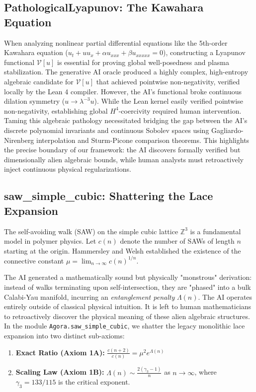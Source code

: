 \documentclass[11pt,a4paper]{article}
\begin{document}
\subsection{PathologicalLyapunov: The Kawahara Equation}
When analyzing nonlinear partial differential equations like the 5th-order Kawahara equation ($u_t + u u_x + \alpha u_{xxx} + \beta u_{xxxxx} = 0$), constructing a Lyapunov functional $\mathcal{V}[u]$ is essential for proving global well-posedness and plasma stabilization. 
The generative AI oracle produced a highly complex, high-entropy algebraic candidate for $\mathcal{V}[u]$ that achieved pointwise non-negativity, verified locally by the Lean 4 compiler. However, the AI's functional broke continuous dilation symmetry ($u \to \lambda^{-3}u$). While the Lean kernel easily verified pointwise non-negativity, establishing global $H^4$-coercivity required human intervention. Taming this algebraic pathology necessitated bridging the gap between the AI's discrete polynomial invariants and continuous Sobolev spaces using Gagliardo-Nirenberg interpolation and Sturm-Picone comparison theorems. This highlights the precise boundary of our framework: the AI discovers formally verified but dimensionally alien algebraic bounds, while human analysts must retroactively inject continuous physical regularizations.

\subsection{saw\_simple\_cubic: Shattering the Lace Expansion}
The self-avoiding walk (SAW) on the simple cubic lattice $\mathbb{Z}^3$ is a fundamental model in polymer physics. Let $c(n)$ denote the number of SAWs of length $n$ starting at the origin. Hammersley and Welsh established the existence of the connective constant $\mu = \lim_{n \to \infty} c(n)^{1/n}$. 

The AI generated a mathematically sound but physically "monstrous" derivation: instead of walks terminating upon self-intersection, they are "phased" into a bulk Calabi-Yau manifold, incurring an \textit{entanglement penalty} $\Lambda(n)$. The AI operates entirely outside of classical physical intuition. It is left to human mathematicians to retroactively discover the physical meaning of these alien algebraic structures. In the module \texttt{Agora.saw\_simple\_cubic}, we shatter the legacy monolithic lace expansion into two distinct sub-axioms:
\begin{enumerate}
    \item \textbf{Exact Ratio (Axiom 1A):} $\frac{c(n+2)}{c(n)} = \mu^2 e^{\Lambda(n)}$
    \item \textbf{Scaling Law (Axiom 1B):} $\Lambda(n) \sim \frac{2(\gamma_3 - 1)}{n}$ as $n \to \infty$, where $\gamma_3 = 133/115$ is the critical exponent.
\end{enumerate}
\end{document}
